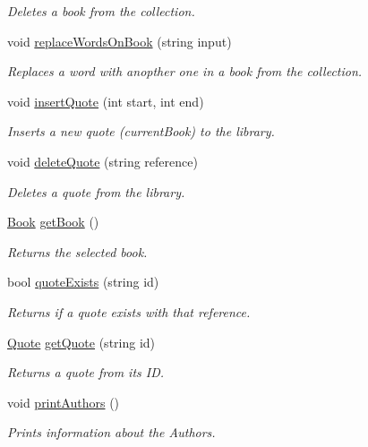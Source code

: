 \begin{DoxyCompactItemize}
\begin{DoxyCompactList}\small\item\em Deletes a book from the collection. \end{DoxyCompactList}\item 
void \hyperlink{class_library_a6d34fd014c959f8c13d9db2edf5bb99a}{replace\-Words\-On\-Book} (string input)
\begin{DoxyCompactList}\small\item\em Replaces a word with anopther one in a book from the collection. \end{DoxyCompactList}\item 
void \hyperlink{class_library_aac2d7d4645a2adda29a0064bc66e6143}{insert\-Quote} (int start, int end)
\begin{DoxyCompactList}\small\item\em Inserts a new quote (current\-Book) to the library. \end{DoxyCompactList}\item 
void \hyperlink{class_library_a8f11e390553184c2a3a549697df3f3a9}{delete\-Quote} (string reference)
\begin{DoxyCompactList}\small\item\em Deletes a quote from the library. \end{DoxyCompactList}\item 
\hyperlink{class_book}{Book} \hyperlink{class_library_a67ccad51c76c3abfb0d46fa533f46e03}{get\-Book} ()
\begin{DoxyCompactList}\small\item\em Returns the selected book. \end{DoxyCompactList}\item 
bool \hyperlink{class_library_a4d87e1bd531b56f79d1faa8781f34630}{quote\-Exists} (string id)
\begin{DoxyCompactList}\small\item\em Returns if a quote exists with that reference. \end{DoxyCompactList}\item 
\hyperlink{class_quote}{Quote} \hyperlink{class_library_aba57d7dcf92c9da4c3d8a359ceba7e2b}{get\-Quote} (string id)
\begin{DoxyCompactList}\small\item\em Returns a quote from its I\-D. \end{DoxyCompactList}\item 
void \hyperlink{class_library_aba2ed0b3b1ee81565ca5b62f2ac5c924}{print\-Authors} ()
\begin{DoxyCompactList}\small\item\em Prints information about the Authors. \end{DoxyCompactList}\item 

\end{DoxyCompactItemize}
